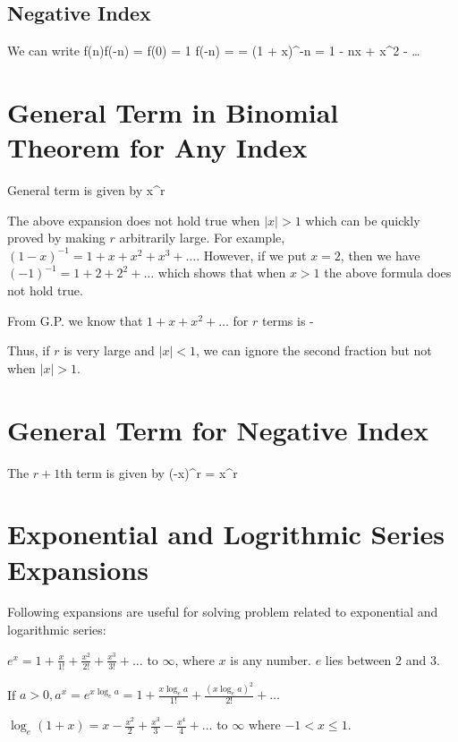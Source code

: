 \subsection{Negative Index}
We can write \startformula f(n)f(-n) = f(0) = 1\stopformula
\startformula \Rightarrow f(-n) =  = (1 + x)^{-n} = 1 - nx + x^2 - \ldots\stopformula

\section{General Term in Binomial Theorem for Any Index}
General term is given by \startformula {}x^r\stopformula

The above expansion does not hold true when $|x| > 1$ which can be quickly proved by making $r$ arbitrarily large. For example, $(1
- x)^{-1} = 1 + x + x^2 + x^3 + \ldots$. However, if we put $x = 2$, then we have $(-1)^{-1} = 1 + 2 + 2^2 + \ldots$ which shows
that when $x > 1$ the above formula does not hold true.

From G.P. we know that $1 + x + x^2 + \ldots$ for $r$ terms is \startformula {} - \stopformula

Thus, if $r$ is very large and $|x| < 1$, we can ignore the second fraction but not when $|x| > 1$.

\section{General Term for Negative Index}
The $r + 1$th term is given by \startformula {}(-x)^r\stopformula
\startformula = x^r\stopformula

\section{Exponential and Logrithmic Series Expansions}
Following expansions are useful for solving problem related to exponential and logarithmic series:
\startitemize[n]
\item $e^x = 1 + \frac{x}{1!} + \frac{x^2}{2!} + \frac{x^3}{3!} + \ldots$ to $\infty$, where $x$ is any number. $e$ lies between
  $2$ and $3$.
\item If $a > 0, a^x = e^{x\log_ea} = 1 + \frac{x\log_ea}{1!} + \frac{(x\log_ea)^2}{2!} + \ldots$
\item $\log_e(1 + x) = x - \frac{x^2}{2} + \frac{x^3}{3} - \frac{x^4}{4} + \ldots$ to $\infty$ where $-1< x\leq 1$.
\stopitemize
\pagebreak
